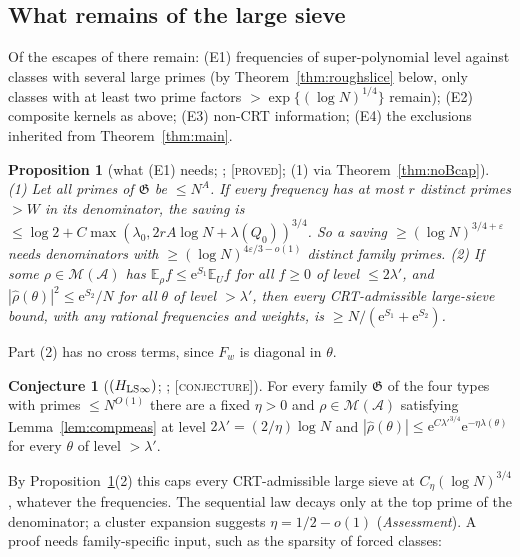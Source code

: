 \documentclass[10pt,reqno]{amsart}
\newtheorem{proposition}[theorem]{Proposition}
\theoremstyle{definition}
\newtheorem{conjecture}[theorem]{Conjecture}
\theoremstyle{remark}
\newcommand{\A}{\mathcal A}
\newcommand{\cG}{\mathfrak G}
\newcommand{\E}{\mathbb E}
\newcommand{\e}{\mathrm e}
\newcommand{\lab}[1]{\textup{[\textsc{#1}]}}
\begin{document}
\subsection{What remains of the large sieve}
Of the escapes of \cite[\S7]{LS} there remain: (E1) frequencies of
super-polynomial level against classes with several large primes (by
Theorem~\ref{thm:roughslice} below, only classes with at least two prime
factors $>\exp\{(\log N)^{1/4}\}$ remain); (E2)
composite kernels as above; (E3) non-CRT information; (E4) the exclusions
inherited from Theorem~\ref{thm:main}.

\begin{proposition}[what (E1) needs; {\cite[Props~5.1, 5.2]{LS2}}; \lab{proved}; (1) via Theorem~\ref{thm:noBcap}]\label{prop:E1}
(1) Let all primes of $\cG$ be $\leq N^A$.  If every frequency has at most $r$
distinct primes $>W$ in its denominator, the saving is
$\leq\log2+C\max(\lambda_0,2rA\log N+\lambda(Q_0))^{3/4}$.  So a saving $\geq(\log N)^{3/4+\varepsilon}$
needs denominators with $\geq(\log N)^{4\varepsilon/3-o(1)}$ distinct family primes.
(2) If some $\rho\in\mathcal M(\A)$ has $\E_\rho f\leq\e^{S_1}\E_Uf$ for all $f\geq0$ of level
$\leq2\lambda'$, and $|\hat\rho(\theta)|^2\leq\e^{S_2}/N$ for all $\theta$ of level $>\lambda'$, then
every CRT-admissible large-sieve bound, with any rational frequencies and
weights, is $\geq N/(\e^{S_1}+\e^{S_2})$.
\end{proposition}
Part (2) has no cross terms, since $F_w$ is diagonal in $\theta$.

\begin{conjecture}[$(H_{{\rm LS}\infty})$; {\cite[\S5]{LS2}}; \lab{conjecture}]\label{conj:HLS}
For every family $\cG$ of the four types with primes $\leq N^{O(1)}$ there are
a fixed $\eta>0$ and $\rho\in\mathcal M(\A)$ satisfying Lemma~\ref{lem:compmeas} at
level $2\lambda'=(2/\eta)\log N$ and $|\hat\rho(\theta)|\leq\e^{C\lambda'^{3/4}}\e^{-\eta\lambda(\theta)}$ for
every $\theta$ of level $>\lambda'$.
\end{conjecture}
By Proposition~\ref{prop:E1}(2) this caps every CRT-admissible large sieve
at $C_\eta(\log N)^{3/4}$, whatever the frequencies.  The sequential law decays
only at the top prime of the denominator; a cluster expansion suggests
$\eta=1/2-o(1)$ (\emph{Assessment}).  A proof needs family-specific input,
such as the sparsity of forced classes:
\end{document}
